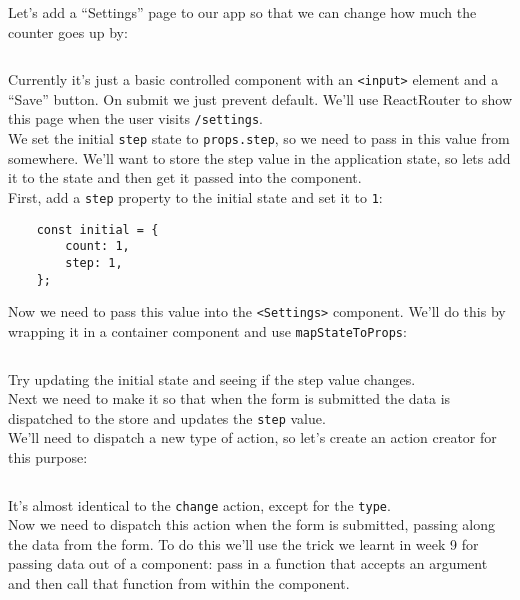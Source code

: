 Let's add a ``Settings'' page to our app so that we can change how much the counter goes up by:

\inputminted{jsx}{03/figures/04-Settings.jsx}

Currently it's just a basic controlled component with an \texttt{<input>} element and a ``Save'' button. On submit we just prevent default. We'll use ReactRouter to show this page when the user visits \texttt{/settings}.
\\

We set the initial \texttt{step} state to \texttt{props.step}, so we need to pass in this value from somewhere. We'll want to store the step value in the application state, so lets add it to the state and then get it passed into the component.
\\

First, add a \texttt{step} property to the initial state and set it to \texttt{1}:

\begin{verbatim}
    const initial = {
        count: 1,
        step: 1,
    };
\end{verbatim}

Now we need to pass this value into the \texttt{<Settings>} component. We'll do this by wrapping it in a container component and use \texttt{mapStateToProps}:

\inputminted{js}{03/figures/05-SettingsProps.js}

Try updating the initial state and seeing if the step value changes.
\\

Next we need to make it so that when the form is submitted the data is dispatched to the store and updates the \texttt{step} value.
\\

We'll need to dispatch a new type of action, so let's create an action creator for this purpose:

\inputminted{js}{03/figures/06-action.js}

It's almost identical to the \texttt{change} action, except for the \texttt{type}.
\\

Now we need to dispatch this action when the form is submitted, passing along the data from the form. To do this we'll use the trick we learnt in week 9 for passing data out of a component: pass in a function that accepts an argument and then call that function from within the component.
\\

